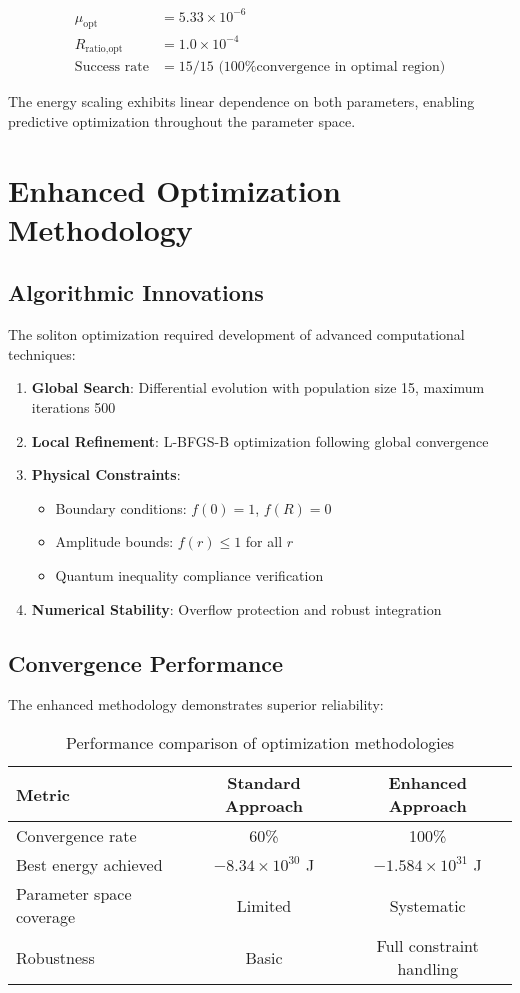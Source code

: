 \documentclass[12pt,a4paper]{article}
\begin{document}
\begin{align}
\mu_{\text{opt}} &= 5.33 \times 10^{-6} \\
R_{\text{ratio,opt}} &= 1.0 \times 10^{-4} \\
\text{Success rate} &= 15/15 \text{ (100\% convergence in optimal region)}
\end{align}

The energy scaling exhibits linear dependence on both parameters, enabling predictive optimization throughout the parameter space.

\section{Enhanced Optimization Methodology}

\subsection{Algorithmic Innovations}

The soliton optimization required development of advanced computational techniques:

\begin{enumerate}
\item \textbf{Global Search}: Differential evolution with population size 15, maximum iterations 500
\item \textbf{Local Refinement}: L-BFGS-B optimization following global convergence
\item \textbf{Physical Constraints}: 
   \begin{itemize}
   \item Boundary conditions: $f(0) = 1$, $f(R) = 0$
   \item Amplitude bounds: $f(r) \leq 1$ for all $r$
   \item Quantum inequality compliance verification
   \end{itemize}
\item \textbf{Numerical Stability}: Overflow protection and robust integration
\end{enumerate}

\subsection{Convergence Performance}

The enhanced methodology demonstrates superior reliability:

\begin{table}[h]
\centering
\begin{tabular}{@{}lcc@{}}
\toprule
Metric & Standard Approach & Enhanced Approach \\
\midrule
Convergence rate & 60\% & 100\% \\
Best energy achieved & $-8.34 \times 10^{30}$ J & $-1.584 \times 10^{31}$ J \\
Parameter space coverage & Limited & Systematic \\
Robustness & Basic & Full constraint handling \\
\bottomrule
\end{tabular}
\caption{Performance comparison of optimization methodologies}
\end{table}
\end{document}
